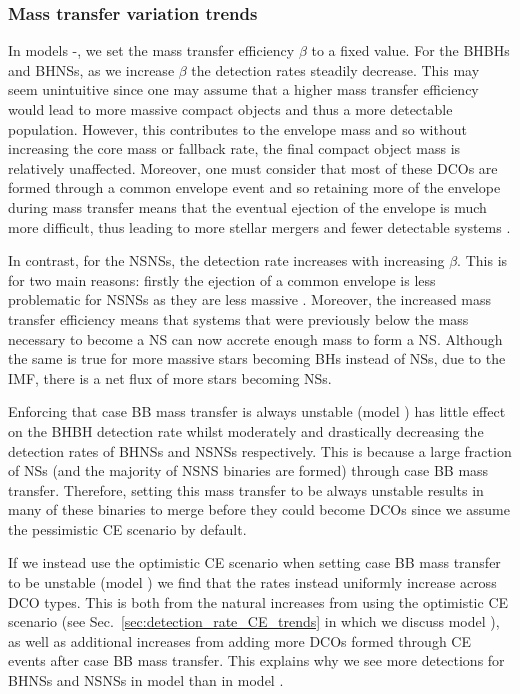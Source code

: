 \subsubsection{Mass transfer variation trends}

In models \modBetaLow{}-\modBetaHigh{}, we set the mass transfer efficiency $\beta$ to a fixed value. For the BHBHs and BHNSs, as we increase $\beta$ the detection rates steadily decrease. This may seem unintuitive since one may assume that a higher mass transfer efficiency would lead to more massive compact objects and thus a more detectable population. However, this contributes to the envelope mass and so without increasing the core mass or fallback rate, the final compact object mass is relatively unaffected. Moreover, one must consider that most of these DCOs are formed through a common envelope event and so retaining more of the envelope during mass transfer means that the eventual ejection of the envelope is much more difficult, thus leading to more stellar mergers and fewer detectable systems \citep[e.g.][]{Kruckow+2018}.

In contrast, for the NSNSs, the detection rate increases with increasing $\beta$. This is for two main reasons: firstly the ejection of a common envelope is less problematic for NSNSs as they are less massive \citep[e.g.][]{Kruckow+2018}. Moreover, the increased mass transfer efficiency means that systems that were previously below the mass necessary to become a NS can now accrete enough mass to form a NS. Although the same is true for more massive stars becoming BHs instead of NSs, due to the IMF, there is a net flux of more stars becoming NSs.

Enforcing that case BB mass transfer is always unstable (model \modCaseBB{}) has little effect on the BHBH detection rate whilst moderately and drastically decreasing the detection rates of BHNSs and NSNSs respectively. This is because a large fraction of NSs (and the majority of NSNS binaries are formed) through case BB mass transfer. Therefore, setting this mass transfer to be always unstable results in many of these binaries to merge before they could become DCOs since we assume the pessimistic CE scenario by default.

If we instead use the optimistic CE scenario when setting case BB mass transfer to be unstable (model \modCaseBBOpt{}) we find that the rates instead uniformly increase across DCO types. This is both from the natural increases from using the optimistic CE scenario (see Sec.~\ref{sec:detection_rate_CE_trends} in which we discuss model \modOpt{}), as well as additional increases from adding more DCOs formed through CE events after case BB mass transfer. This explains why we see more detections for BHNSs and NSNSs in model \modCaseBBOpt{} than in model \modOpt{}.

